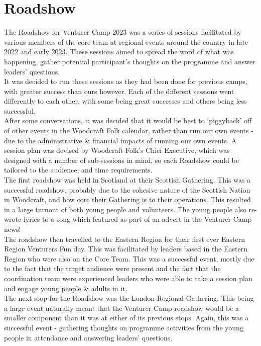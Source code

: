 \chapter{Roadshow}
The Roadshow for Venturer Camp 2023 was a series of sessions facilitated by various members of the core team at regional events around the country in late 2022 and early 2023. These sessions aimed to spread the word of what was happening, gather potential participant's thoughts on the programme and answer leaders' questions.\\

It was decided to run these sessions as they had been done for previous camps, with greater success than ours however. Each of the different sessions went differently to each other, with some being great successes and others being less successful.\\

After some conversations, it was decided that it would be best to `piggyback' off of other events in the Woodcraft Folk calendar, rather than run our own events - due to the administrative \& financial impacts of running our own events. A session plan was devised by Woodcraft Folk's Chief Executive, which was designed with a number of sub-sessions in mind, so each Roadshow could be tailored to the audience, and time requirements.\\

The first roadshow was held in Scotland at their Scottish Gathering. This was a successful roadshow, probably due to the cohesive nature of the Scottish Nation in Woodcraft, and how core their Gathering is to their operations. This resulted in a large turnout of both young people and volunteers. The young people also re-wrote lyrics to a song which featured as part of an advert in the Venturer Camp news!\\

The roadshow then travelled to the Eastern Region for their first ever Eastern Region Venturers Fun day. This was facilitated by leaders based in the Eastern Region who were also on the Core Team. This was a successful event, mostly due to the fact that the target audience were present and the fact that the coordination team were experienced leaders who were able to take a session plan and engage young people \& adults in it.\\

The next stop for the Roadshow was the London Regional Gathering. This being a large event naturally meant that the Venturer Camp roadshow would be a smaller component than it was at either of its previous stops. Again, this was a successful event - gathering thoughts on programme activities from the young people in attendance and answering leaders' questions.\\

